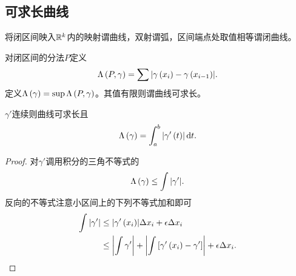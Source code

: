 \documentclass{ctexrep}
\begin{document}
  \subsection{可求长曲线}
  \begin{definition}
    将闭区间映入$\mathbb{R}^k$内的映射谓曲线，双射谓弧，区间端点处取值相等谓闭曲线。
  \end{definition}
  \begin{definition}
    对闭区间的分法$P$定义
    \[ \Lambda\left(P,\gamma\right) = \sum\abs{\gamma\left(x_i\right)-\gamma\left(x_{i-1}\right)}. \]
    定义$\Lambda\left(\gamma\right)=\sup \Lambda\left(P,\gamma\right)$。其值有限则谓曲线可求长。
  \end{definition}
  \begin{theorem}
    $\gamma'$连续则曲线可求长且
    \[ \Lambda\left(\gamma\right) = \int_a^b \abs{\gamma'\left(t\right)}\, \mathrm{d} t. \]
  \end{theorem}
  \begin{proof}
    对$\gamma'$调用积分的三角不等式的
    \[ \Lambda\left(\gamma\right)\le \int \abs{\gamma'}. \]
    反向的不等式注意小区间上的下列不等式加和即可
    \begin{align*}
      \int \abs{\gamma'} &\le \abs{\gamma'\left(x_i\right)}\Delta x_i + \epsilon\Delta x_i\\
      &\le \abs{\int \gamma'} + \abs{\int\left[\gamma'\left(x_i\right)-\gamma'\right]} + \epsilon \Delta x_i.\qedhere
    \end{align*}
  \end{proof}
  
 
\ifx\allfiles\undefined %
\end{document}
